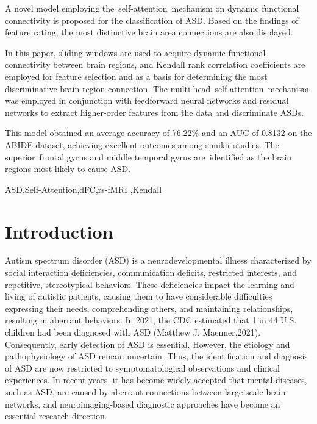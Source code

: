 \documentclass[a4paper]{cas-dc}
\begin{document}
\begin{highlights}
\item A novel model employing the self-attention mechanism on dynamic functional connectivity is proposed for the classification of ASD. Based on the findings of feature rating, the most distinctive brain area connections are also displayed.

\item In this paper, sliding windows are used to acquire dynamic functional connectivity between brain regions, and Kendall rank correlation coefficients are employed for feature selection and as a basis for determining the most discriminative brain region connection. The multi-head self-attention mechanism was employed in conjunction with feedforward neural networks and residual networks to extract higher-order features from the data and discriminate ASDs.

\item This model obtained an average accuracy of 76.22\% and an AUC of 0.8132 on the ABIDE dataset, achieving excellent outcomes among similar studies. The superior frontal gyrus and middle temporal gyrus are identified as the brain regions most likely to cause ASD. 
\end{highlights}

\begin{keywords}
 ASD\sep Self-Attention\sep dFC\sep rs-fMRI \sep Kendall
\end{keywords}

\maketitle

\section{Introduction}\label{Introduction}
Autism spectrum disorder (ASD) is a neurodevelopmental illness characterized by social interaction deficiencies, communication deficits, restricted interests, and repetitive, stereotypical behaviors. These deficiencies impact the learning and living of autistic patients, causing them to have considerable difficulties expressing their needs, comprehending others, and maintaining relationships, resulting in aberrant behaviors. In 2021, the CDC estimated that 1 in 44 U.S. children had been diagnosed with ASD (Matthew J. Maenner,2021). Consequently, early detection of ASD is essential. However, the etiology and pathophysiology of ASD remain uncertain. Thus, the identification and diagnosis of ASD are now restricted to symptomatological observations and clinical experiences. In recent years, it has become widely accepted that mental diseases, such as ASD, are caused by aberrant connections between large-scale brain networks, and neuroimaging-based diagnostic approaches have become an essential research direction.
\end{document}
